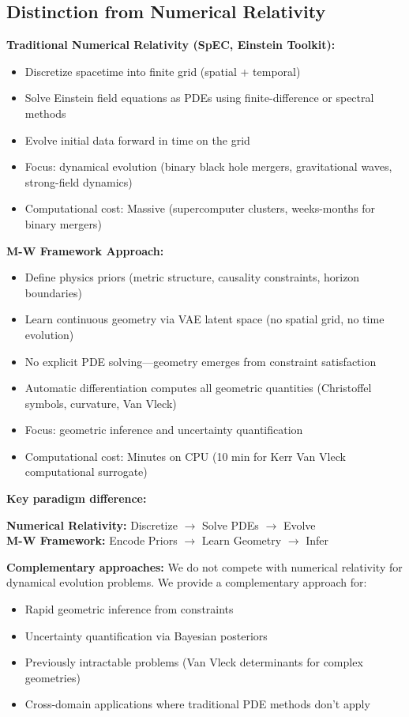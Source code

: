 \documentclass[11pt,a4paper]{article}
\begin{document}
\subsection{Distinction from Numerical Relativity}

\textbf{Traditional Numerical Relativity (SpEC, Einstein Toolkit):}
\begin{itemize}
\item Discretize spacetime into finite grid (spatial + temporal)
\item Solve Einstein field equations as PDEs using finite-difference or spectral methods
\item Evolve initial data forward in time on the grid
\item Focus: dynamical evolution (binary black hole mergers, gravitational waves, strong-field dynamics)
\item Computational cost: Massive (supercomputer clusters, weeks-months for binary mergers)
\end{itemize}

\textbf{M-W Framework Approach:}
\begin{itemize}
\item Define physics priors (metric structure, causality constraints, horizon boundaries)
\item Learn continuous geometry via VAE latent space (no spatial grid, no time evolution)
\item No explicit PDE solving—geometry emerges from constraint satisfaction
\item Automatic differentiation computes all geometric quantities (Christoffel symbols, curvature, Van Vleck)
\item Focus: geometric inference and uncertainty quantification
\item Computational cost: Minutes on CPU (10 min for Kerr Van Vleck computational surrogate)
\end{itemize}

\textbf{Key paradigm difference:}
\begin{center}
\textbf{Numerical Relativity:} Discretize $\to$ Solve PDEs $\to$ Evolve\\
\textbf{M-W Framework:} Encode Priors $\to$ Learn Geometry $\to$ Infer
\end{center}

\textbf{Complementary approaches:} We do not compete with numerical relativity for dynamical evolution problems. We provide a complementary approach for:
\begin{itemize}
\item Rapid geometric inference from constraints
\item Uncertainty quantification via Bayesian posteriors
\item Previously intractable problems (Van Vleck determinants for complex geometries)
\item Cross-domain applications where traditional PDE methods don't apply
\end{itemize}
\end{document}
